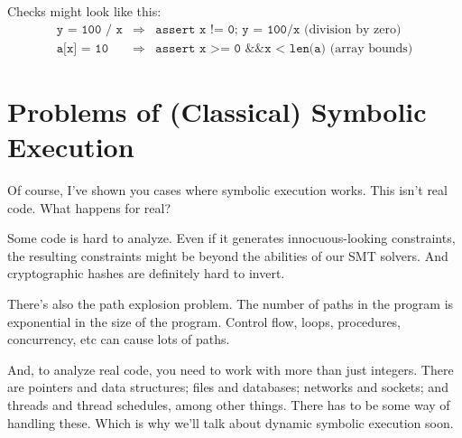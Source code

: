 \documentclass[11pt]{article}
\begin{document}
Checks might look like this:
\begin{eqnarray*}
 \texttt{y = 100 / x} &\Rightarrow& \texttt{assert x != 0; y = 100/x} \mbox{ (division by zero)}\\
 \texttt{a[x] = 10} &\Rightarrow& \texttt{assert x >= 0 \&\& x < len(a)} \mbox{ (array bounds)}
\end{eqnarray*}

\section*{Problems of (Classical) Symbolic Execution}
Of course, I've shown you cases where symbolic execution works. This isn't real code. What happens for real?

Some code is hard to analyze. Even if it generates innocuous-looking constraints, the resulting constraints might be beyond the abilities of our SMT solvers. And cryptographic hashes are definitely hard to invert.

There's also the path explosion problem. The number of paths in the program is exponential in the size of the program. Control flow, loops, procedures, concurrency, etc can cause lots of paths.

And, to analyze real code, you need to work with more than just integers.
There are pointers and data structures; files and databases; networks and sockets; and threads and thread schedules, among other things. There has to be some way of handling these. 
Which is why we'll talk about dynamic symbolic execution soon.




\end{document}
